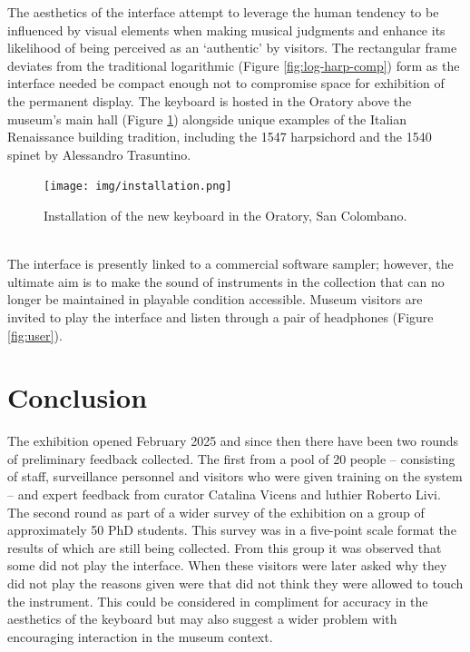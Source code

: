 The aesthetics of the interface attempt to leverage the human tendency to be influenced by visual elements when making musical judgments \cite{tsay_sight_2013, fritz_player_2012,fritz_soloist_2014,fritz_listener_2017} and enhance its likelihood of being perceived as an `authentic' by visitors. The rectangular frame deviates from the traditional logarithmic (Figure \ref{fig:log-harp-comp}) form as the interface needed be compact enough not to compromise space for exhibition of the permanent display. The keyboard is hosted in the Oratory above the museum's main hall (Figure \ref{fig:installed}) alongside unique examples of the Italian Renaissance building tradition, including the 1547 harpsichord and the 1540 spinet by Alessandro Trasuntino.

\begin{figure}
    \centering
    \texttt{[image: img/installation.png]}
    \caption{Installation of the new keyboard in the Oratory, San Colombano.}
    \label{fig:installed}
\end{figure}
\\

The interface is presently linked to a commercial software sampler; however, the ultimate aim is to make the sound of instruments in the collection that can no longer be maintained in playable condition accessible. Museum visitors are invited to play the interface and listen through a pair of headphones (Figure \ref{fig:user}).


\section{Conclusion}

The exhibition opened February 2025 and since then there have been two rounds of preliminary feedback collected. The first from a pool of 20 people -- consisting of staff, surveillance personnel and visitors who were given training on the system -- and expert feedback from curator Catalina Vicens and luthier Roberto Livi. The second round as part of a wider survey of the exhibition on a group of approximately 50 PhD students. This survey was in a five-point scale format the results of which are still being collected. From this group it was observed that some did not play the interface. When these visitors were later asked why they did not play the reasons given were that did not think they were allowed to touch the instrument. This could be considered in compliment for accuracy in the aesthetics of the keyboard but may also suggest a wider problem with  encouraging interaction in the museum context.

